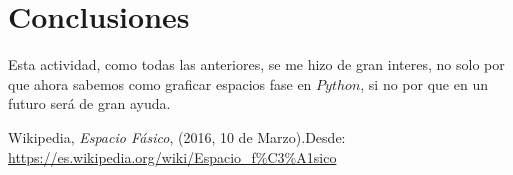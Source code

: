\documentclass[12pt,letterpaper]{article}
\begin{document}
 
\section*{Conclusiones}
Esta actividad, como todas las anteriores, se me hizo de gran interes, no solo por que ahora sabemos como graficar espacios fase en $Python$, si no por que en un futuro será de gran ayuda.

\begin{thebibliography}{widestlabel}
       Wikipedia, \emph{Espacio Fásico}, (2016, 10 de Marzo).Desde: \url{https://es.wikipedia.org/wiki/Espacio_f\%C3\%A1sico}
\end{thebibliography}
\end{document}
